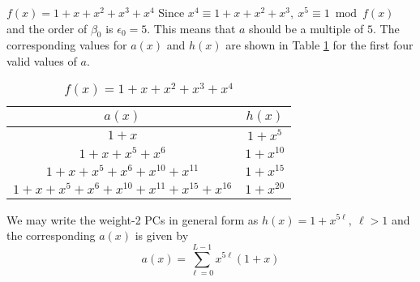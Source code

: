 
\begin{example}
$f(x)=1+x+x^2+x^3+x^4$\newline
Since $x^4 \equiv 1+x+x^2+x^3,~x^5 \equiv 1 \bmod f(x)$ and the order of $\beta_0$ is $\epsilon_0=5$. This means that $a$ should be a multiple of $5$. The corresponding values for $a(x)$ and $h(x)$ are shown in Table \ref{novelTab3} for the first four valid values of $a$.

\begin{table}[htbp]
\caption{$f(x)=1+x+x^2+x^3+x^4$}
\centering
\begin{tabular}{c c} 
 \hline
 $a(x)$ & $h(x)$  \\ [0.5ex] 
 \hline\hline
$1+x$ &$1+x^5$\\ 
$1+x+x^5+x^6$ &$1+x^{10}$  \\
$1+x+x^5+x^6+x^{10}+x^{11}$ & $1+x^{15}$ \\
$1+x+x^5+x^6+x^{10}+x^{11}+x^{15}+x^{16}$ &$1+x^{20}$  
 \end{tabular}
 \label{novelTab3}
\end{table}
\label{ex-3}
We may write the weight-2 PCs in general form as $h(x)=1+x^{5\ell},~\ell>1$ and the corresponding $a(x)$ is given by 
\begin{equation*}
a(x)=\sum_{\ell=0}^{L-1} x^{5\ell}(1+x)
\end{equation*}
\end{example}

